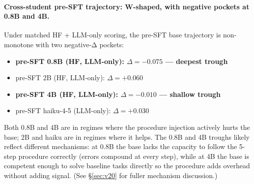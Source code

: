 \documentclass[10pt]{article}
\begin{document}
\paragraph{Cross-student pre-SFT trajectory: W-shaped, with negative pockets at 0.8B and 4B.} Under matched HF + LLM-only scoring, the pre-SFT base trajectory is non-monotone with two negative-Δ pockets:
\begin{itemize}[leftmargin=*, nosep]
  \item \textbf{pre-SFT 0.8B (HF, LLM-only): $\Delta = -0.075$ --- deepest trough}
  \item pre-SFT 2B (HF, LLM-only): $\Delta = +0.060$
  \item \textbf{pre-SFT 4B (HF, LLM-only): $\Delta = -0.010$ --- shallow trough}
  \item pre-SFT haiku-4-5 (LLM-only): $\Delta = +0.030$
\end{itemize}
Both 0.8B and 4B are in regimes where the procedure injection actively hurts the base; 2B and haiku are in regimes where it helps. The 0.8B and 4B troughs likely reflect different mechanisms: at 0.8B the base lacks the capacity to follow the 5-step procedure correctly (errors compound at every step), while at 4B the base is competent enough to solve baseline tasks directly so the procedure adds overhead without adding signal. (See \S\ref{sec:v20} for fuller mechanism discussion.)
\end{document}
